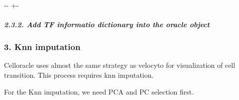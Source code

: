 \documentclass[letterpaper,10pt,english]{sphinxmanual}
\newlength\nbsphinxcodecellspacing
\begin{document}
%
{
\kern-\sphinxverbatimsmallskipamount\kern-\baselineskip
\kern+\FrameHeightAdjust\kern-\fboxrule
\vspace{\nbsphinxcodecellspacing}
%
\begin{sphinxVerbatim}[commandchars=\\\{\}]

\end{sphinxVerbatim}
}
\relax


\subparagraph{2.3.2. Add TF informatio dictionary into the oracle object}
\label{\detokenize{notebooks/04_Network_analysis/Network_analysis_with_with_Paul_etal_2015_data:2.3.2.-Add-TF-informatio-dictionary-into-the-oracle-object}}
{
%
\begin{sphinxVerbatim}[commandchars=\\\{\}]
\llap{\color{nbsphinxin}[18]:\,\hspace{\fboxrule}\hspace{\fboxsep}}
\end{sphinxVerbatim}
}


\subsubsection{3. Knn imputation}
\label{\detokenize{notebooks/04_Network_analysis/Network_analysis_with_with_Paul_etal_2015_data:3.-Knn-imputation}}
Celloracle uses almost the same strategy as velocyto for visualization of cell transition. This process requires knn imputation.

For the Knn imputation, we need PCA and PC selection first.
\end{document}
